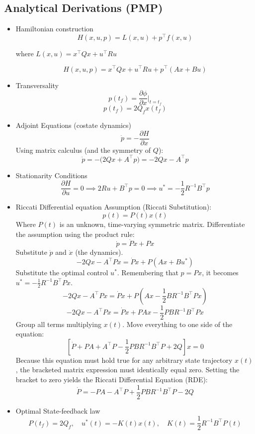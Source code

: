 \documentclass[letterpaper, 10 pt, conference]{ieeeconf}
\begin{document}
\subsection{Analytical Derivations (PMP)}

\begin{itemize}
    \item Hamiltonian construction
    \[H(x, u, p) = L(x, u) + p^\top f(x, u)\] 
    \vspace{2pt}\centerline{where $L(x,u)=x^\top Qx + u^\top Ru$}\vspace{2pt}
    \[H(x, u, p) = x^\top Q x + u^\top R u + p^\top (Ax + Bu)\]
    
    \item Transversality
    \[p(t_f) = \frac{\partial \phi}{\partial x}\bigg|_{t=t_f}\]
    \[p(t_f) = 2 Q_f x(t_f) \]
    
    \item Adjoint Equations (costate dynamics)
    \[\dot{p} = -\frac{\partial H}{\partial x}\]
    Using matrix calculus (and the symmetry of $Q$):
    \[\dot{p} = -\big( 2 Q x + A^\top p \big) = -2 Q x - A^\top p \]
    
    \item Stationarity Conditions
    \[\frac{\partial H}{\partial u} = 0 \implies 2 R u + B^\top p = 0 \implies u^* = -\frac{1}{2} R^{-1} B^\top p \]
    
    \item Riccati Differential equation
    Assumption (Riccati Substitution): 
    \[p(t) = P(t)x(t)\] 
    Where $P(t)$ is an unknown, time-varying symmetric matrix. Differentiate the assumption using the product rule:
    \[\dot{p} = \dot{P}x + P\dot{x}\]
    Substitute $\dot{p}$ and $\dot{x}$ (the dynamics).
    \[-2Qx - A^\top P x = \dot{P}x + P(Ax + Bu^*)\]
    Substitute the optimal control $u^*$. Remembering that $p = Px$, it becomes $u^* = -\frac{1}{2} R^{-1} B^\top P x$.
    \[-2Qx - A^\top P x = \dot{P}x + P\left(Ax - \frac{1}{2} B R^{-1} B^\top P x\right)\]
    \[-2Qx - A^\top P x = \dot{P}x + PAx - \frac{1}{2} P B R^{-1} B^\top P x\]
    Group all terms multiplying $x(t)$. Move everything to one side of the equation:
    \[\left[ \dot{P} + P A + A^\top P - \frac{1}{2} P B R^{-1} B^\top P + 2Q \right] x = 0\]
    Because this equation must hold true for any arbitrary state trajectory $x(t)$, the bracketed matrix expression must identically equal zero. Setting the bracket to zero yields the Riccati Differential Equation (RDE): 
    \[\boxed{\dot{P} = -P A - A^\top P + \frac{1}{2} P B R^{-1} B^\top P - 2Q}\]
    
    \item Optimal State-feedback law
    \[P(t_f) = 2 Q_f, \quad u^*(t) = -K(t) x(t), \quad K(t) = \frac{1}{2} R^{-1} B^\top P(t)\]
\end{itemize}
\end{document}

